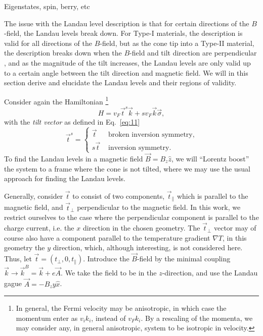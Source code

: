 Eigenstates, spin, berry, etc

The issue with the Landau level description is that for certain directions of the \(B\)-field, the Landau levels break down.
For Type-I materials, the description is valid for all directions of the \(B\)-field, but as the cone tip into a Type-II material, the description breaks down when the \(B\)-field and tilt direction are perpendicular \cite{sharmaChiralAnomalyLongitudinal2017}, and as the magnitude of the tilt increases, the Landau levels are only valid up to a certain angle between the tilt direction and magnetic field.
We will in this section derive and elucidate the Landau levels and their regions of validity.

Consider again the Hamiltonian
\footnote{In general, the Fermi velocity may be anisotropic, in which case the momentum enter as \( v_i k_i \), instead of \( v_F k_i \). By a rescaling of the momenta, we may consider any, in general anisotropic, system to be isotropic in velocity.}
\begin{equation}
  \label{eq:29}
  H = v_{F} \vec{t}^s  \vec{k} + s v_{F} \vec{k} \vec{\sigma},
\end{equation}
with the \emph{tilt vector} as defined in Eq.~\eqref{eq:11}
\[
  \vec{t}^s
  =
  \begin{cases}
    \vec{t} & \text{ broken inversion symmetry},\\
    s \vec{t} & \text{ inversion symmetry}.
  \end{cases}
\]
To find the Landau levels in a magnetic field \(\vec{B} = B_{z}\hat{z} \), we will ``Lorentz boost'' the system to a frame where the cone is not tilted, where we may use the usual approach for finding the Landau levels.

Generally, consider \( \vec{t} \) to consist of two components, \( \vec{t}_{\parallel} \) which is parallel to the magnetic field, and \( \vec{t}_{\perp} \) perpendicular to the magnetic field.
In this work, we restrict ourselves to the case where the perpendicular component is parallel to the charge current, i.e. the \( x \) direction in the chosen geometry.
The \( \vec{t}_{\perp} \) vector may of course also have a component parallel to the temperature gradient \( \nabla T \), in this geometry the \( y \) direction, which, although interesting, is not considered here.
Thus, let \( \vec{t} = (t_{\perp}, 0, t_{\parallel}) \).
Introduce the \(\vec{B}\)-field by the minimal coupling \(\vec{k} \to \vec{k}^B = \vec{k} + e \vec{A}\).
We take the field to be in the \( z \)-direction, and use the Landau gague \(\vec{A} = -B_{z}y \hat{x}\).

